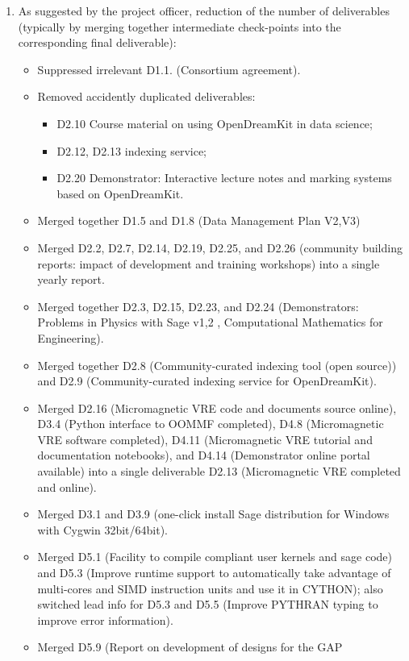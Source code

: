 \documentclass[noworkareas,deliverables,\classoptions]{euproposal}       %
\begin{document}
\begin{proposal}
\begin{enumerate}
\item As suggested by the project officer, reduction of the number of
  deliverables (typically by merging together intermediate
  check-points into the corresponding final deliverable):
  \begin{itemize}
  \item Suppressed irrelevant D1.1. (Consortium agreement).
  \item Removed accidently duplicated deliverables:
    \begin{itemize}
    \item D2.10 Course material on using OpenDreamKit in data science;
    \item D2.12, D2.13 indexing service;
    \item D2.20 Demonstrator: Interactive lecture notes and marking
      systems based on OpenDreamKit.
    \end{itemize}
  \item Merged together D1.5 and D1.8 (Data Management Plan V2,V3)
  \item Merged D2.2, D2.7, D2.14, D2.19, D2.25, and D2.26 (community
    building reports: impact of development and training workshops)
    into a single yearly report.
  \item Merged together D2.3, D2.15, D2.23, and D2.24 (Demonstrators:
    Problems in Physics with Sage v1,2 , Computational Mathematics for
    Engineering).
  \item Merged together D2.8 (Community-curated indexing tool (open
    source)) and D2.9 (Community-curated indexing service for
    OpenDreamKit).
  \item Merged D2.16 (Micromagnetic VRE code and documents source
    online), D3.4 (Python interface to OOMMF completed), D4.8
    (Micromagnetic VRE software completed), D4.11 (Micromagnetic VRE
    tutorial and documentation notebooks), and D4.14 (Demonstrator
    online portal available) into a single deliverable D2.13
    (Micromagnetic VRE completed and online).
  \item Merged D3.1 and D3.9 (one-click install Sage distribution for
    Windows with Cygwin 32bit/64bit).
  \item Merged D5.1 (Facility to compile \Pythran compliant user
    kernels and sage code) and D5.3 (Improve \Pythran runtime support
    to automatically take advantage of multi-cores and SIMD
    instruction units and use it in CYTHON); also switched lead info
    for D5.3 and D5.5 (Improve PYTHRAN typing to improve error
    information).
  \item Merged D5.9 (Report on development of designs for the GAP

\end{itemize}
\end{enumerate}
\end{proposal}
\end{document}
